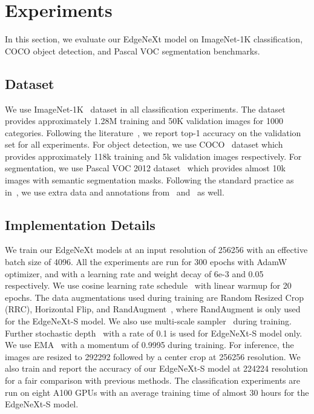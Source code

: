 \documentclass[runningheads]{llncs}
\begin{document}
\section{Experiments}
In this section, we evaluate our EdgeNeXt model on ImageNet-1K classification, COCO object detection, and Pascal VOC segmentation benchmarks.

\subsection{Dataset}
We use ImageNet-1K~\cite{imagenet} dataset in all classification experiments. The dataset provides approximately 1.28M training and 50K validation images for 1000 categories. Following the literature~\cite{MobileNet,MobileViT}, we report top-1 accuracy on the validation set for all experiments.
For object detection, we use COCO~\cite{COCO} dataset which provides approximately 118k training and 5k validation images respectively. For segmentation, we use Pascal VOC 2012 dataset~\cite{voc} which provides almost 10k images with semantic segmentation masks. Following the standard practice as in~\cite{MobileViT}, we use extra data and annotations from~\cite{COCO} and~\cite{hariharan2011semantic} as well.

\subsection{Implementation Details}
We train our EdgeNeXt models at an input resolution of 256256 with an effective batch size of 4096. All the experiments are run for 300 epochs with AdamW~\cite{AdamW} optimizer, and with a learning rate and weight decay of 6e-3 and 0.05 respectively. We use cosine learning rate schedule~\cite{Cosine} with linear warmup for 20 epochs. The data augmentations used during training are Random Resized Crop (RRC), Horizontal Flip, and RandAugment~\cite{RandAugment}, where RandAugment is only used for the EdgeNeXt-S model. We also use multi-scale sampler~\cite{MobileViT} during training. Further stochastic depth~\cite{StochasticDepth} with a rate of 0.1 is used for EdgeNeXt-S model only. We use EMA~\cite{polyak1992acceleration} with a momentum of 0.9995 during training. For inference, the images are resized to 292292 followed by a center crop at 256256 resolution. We also train and report the accuracy of our EdgeNeXt-S model at 224224 resolution for a fair comparison with previous methods. The classification experiments are run on eight A100 GPUs with an average training time of almost 30 hours for the EdgeNeXt-S model.
\end{document}
